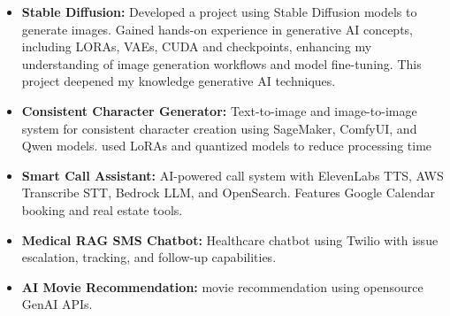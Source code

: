 

\begin{cventries}



 \begin{itemize}
 \item \textbf{Stable Diffusion: } Developed a project using Stable Diffusion models to generate images. Gained hands-on experience in generative AI concepts, including LORAs, VAEs, CUDA and checkpoints, enhancing my understanding of image generation workflows and model fine-tuning. This project deepened my knowledge generative AI techniques.
 \item \textbf{Consistent Character Generator: } Text-to-image and image-to-image system for consistent character creation using SageMaker, ComfyUI, and Qwen models. used LoRAs and quantized models to reduce processing time
 \item \textbf{Smart Call Assistant: } AI-powered call system with ElevenLabs TTS, AWS Transcribe STT, Bedrock LLM, and OpenSearch. Features Google Calendar booking and real estate tools.
 \item \textbf{Medical RAG SMS Chatbot: } Healthcare chatbot using Twilio with issue escalation, tracking, and follow-up capabilities.
 \item  \textbf{AI Movie Recommendation: }movie recommendation using opensource GenAI APIs.

 \end{itemize}


\end{cventries}
